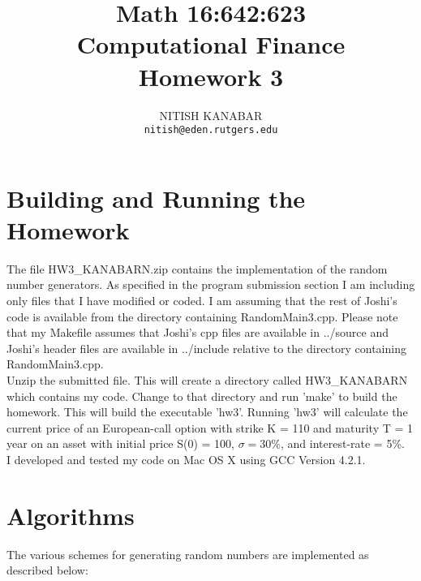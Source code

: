 \documentclass[letterpaper,twoside,11pt,fleqn]{article}
\begin{document}

\title{Math 16:642:623 \\Computational Finance \\ Homework 3}
\author{NITISH KANABAR \\ \texttt{nitish@eden.rutgers.edu}}

\maketitle

\thispagestyle{empty} 

\clearpage
\vfill
\pagebreak


\setcounter{page}{1}


\section*{Building and Running the Homework}

The file HW3\_KANABARN.zip contains the implementation of the random number generators. As specified in the program submission section I am including only files that I have modified or coded.  I am assuming that the rest of Joshi's code is available from the directory containing RandomMain3.cpp.  Please note that my Makefile assumes that Joshi's cpp files are available in ../source and Joshi's header files are available in ../include relative to the directory containing RandomMain3.cpp. \\


Unzip the submitted file. This will create a directory called HW3\_KANABARN which contains my code.  Change to that directory and run 'make' to build the homework.  This will build the executable 'hw3'.  Running 'hw3' will calculate the current price of an European-call option with strike K = 110 and maturity T = 1 year on an asset with initial price S(0) = 100, \(\sigma = 30\%\), and interest-rate = 5\%. \\

I developed and tested my code on Mac OS X using GCC Version 4.2.1.


\section*{Algorithms}
The various schemes for generating random numbers are implemented as described below:
\end{document}
